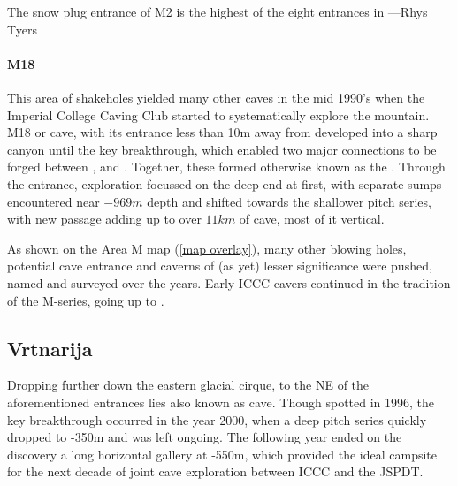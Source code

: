 \begin{marginfigure}
\checkoddpage \ifoddpage \forcerectofloat \else \forceversofloat \fi
\centering
 \caption{The snow plug entrance of M2 is the highest of the eight entrances in \protect{} ---Rhys Tyers}
 \label{surfaceM2}
\end{marginfigure}

\paragraph{M18} This area of shakeholes yielded many other caves in the mid 1990's when the Imperial College Caving Club started to systematically explore the mountain. M18 or  cave, with its entrance less than 10m away from  developed into a sharp canyon until the key  breakthrough, which enabled two major connections to be forged between ,  and . Together, these formed  otherwise known as the . Through the  entrance, exploration focussed on the deep end at first, with separate sumps encountered near $-969m$ depth and shifted towards the shallower pitch series, with new passage adding up to over $11km$ of cave, most of it vertical.

As shown on the Area M map (\vref{map overlay}), many other blowing holes, potential cave entrance and caverns of (as yet) lesser significance were pushed, named and surveyed over the years. Early ICCC cavers continued in the tradition of the M-series, going up to . 

\subsection{Vrtnarija} Dropping further down the eastern glacial cirque, to the NE of the aforementioned entrances lies  also known as   cave. Though spotted in 1996, the key breakthrough occurred in the year 2000, when a deep pitch series quickly dropped to -350m and was left ongoing. The following year ended on the discovery a long horizontal gallery at -550m, which provided the ideal campsite for the next decade of joint cave exploration between ICCC and the JSPDT.


